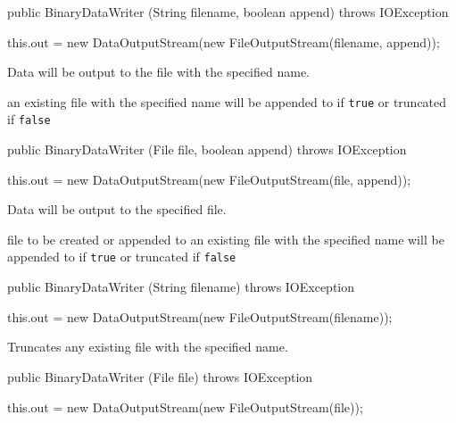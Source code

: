 \begin{code}

   public BinaryDataWriter (String filename, boolean append)
         throws IOException \begin{hide} {
      this.out = new DataOutputStream(new FileOutputStream(filename, append));
   }
   \end{hide}
\end{code}
\begin{tabb}
 Data will be output to the file with the specified name.
\end{tabb}
\begin{htmlonly}
  {an existing file with the specified name will be appended to if \texttt{true} or truncated if \texttt{false}}
\end{htmlonly}
\begin{code}
   
   public BinaryDataWriter (File file, boolean append) throws IOException \begin{hide} {
      this.out = new DataOutputStream(new FileOutputStream(file, append));
   }
   \end{hide}
\end{code}
\begin{tabb}
 Data will be output to the specified file.
\end{tabb}
\begin{htmlonly}
    {file to be created or appended to}
  {an existing file with the specified name will be appended to if \texttt{true} or truncated if \texttt{false}}
\end{htmlonly}
\begin{code}
   
   public BinaryDataWriter (String filename) throws IOException \begin{hide} {
      this.out = new DataOutputStream(new FileOutputStream(filename));
   }
   \end{hide}
\end{code}
\begin{tabb}
 Truncates any existing file with the specified name.
\end{tabb}
\begin{htmlonly}
\end{htmlonly}
\begin{code}

   public BinaryDataWriter (File file) throws IOException \begin{hide} {
      this.out = new DataOutputStream(new FileOutputStream(file));
   }
   \end{hide}
\end{code}

